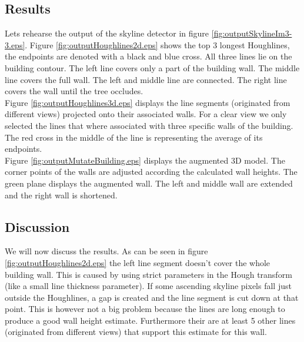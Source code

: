 \documentclass[10pt]{article}
\begin{document}
	

\subsection{Results}
Lets rehearse the output of the skyline detector in figure \ref{fig:outputSkylineIm3-3.eps}.
Figure \ref{fig:outputHoughlines2d.eps} shows the top 3 longest Houghlines, the
endpoints are denoted with a black and blue cross. All three lines lie on the
building contour.  The left line covers only a part of the building wall. The
middle line covers the full wall. The left and middle line are connected. The
right line covers the wall until the tree occludes.\\

Figure \ref{fig:outputHoughlines3d.eps} displays the line segments (originated from
different views) projected onto their associated walls.  For a clear view we
only selected the lines that where associated with three specific walls of the building.  
The red cross in the middle of the line is representing the average of its endpoints.\\

Figure \ref{fig:outputMutateBuilding.eps} displays the augmented 3D model. The
corner points of the walls are adjusted according the calculated wall heights.
The green plane displays the augmented wall. The left and middle wall are extended
and the right wall is shortened.\\


\subsection{Discussion}
We will now discuss the results. As can be seen in figure
\ref{fig:outputHoughlines2d.eps} the left line segment doesn't cover the whole
building wall. This is caused by using strict parameters in the Hough transform
(like a small line thickness parameter).  If some ascending skyline pixels fall just outside
the Houghlines, a gap is created and the line segment is cut down at that point.
This is however not a big problem because the lines are long enough to produce a
good wall height estimate. Furthermore their are at least 5 other lines
(originated from different views) that
support this estimate for this wall.\\
\end{document}
